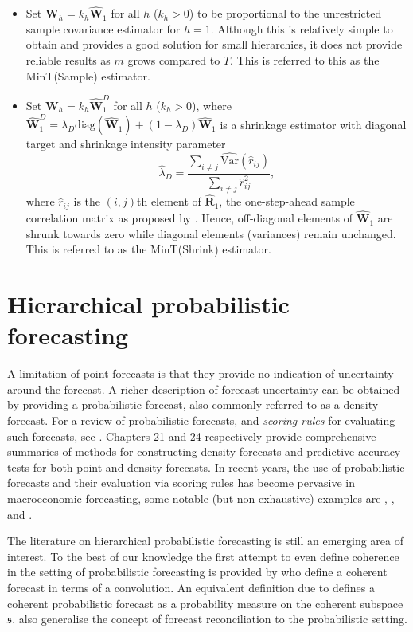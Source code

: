 {\begin{itemize}
	\item Set $\bm{W}_{h}=k_{h}\hat{\bm{W}}_{1}$ for all $h$ ($k_{h} > 0$) to be proportional to the unrestricted sample covariance estimator for $h=1$. Although this is relatively simple to obtain and provides a good solution for small hierarchies, it does not provide reliable results as $m$ grows compared to $T$. This is referred to this as the MinT(Sample) estimator.

	\item Set $\bm{W}_{h}=k_{h}\hat{\bm{W}}_{1}^D$ for all $h$ ($k_{h} > 0$), where $\hat{\bm{W}}^{D}_{1} = \lambda_{D} \text{diag}(\hat{\bm{W}}_{1}) + (1 - \lambda_{D})\hat{\bm{W}}_{1}$ is a shrinkage estimator with diagonal target and shrinkage intensity parameter
  $$
    \hat{\lambda}_{D} = \frac{\sum_{i \ne j}\hat{\text{Var}}(\hat{r}_{ij})}{\sum_{i \ne j}\hat{r}_{ij}^2},
  $$
	where $\hat{r}_{ij}$ is the $(i,j)$th element of $\hat{\bm{R}}_{1}$, the one-step-ahead sample correlation matrix as proposed by \citet{Schafer2005}. Hence, off-diagonal elements of $\hat{\bm{W}}_1$ are shrunk towards zero while diagonal elements (variances) remain unchanged. This is referred to as the MinT(Shrink) estimator.
\end{itemize}

\section{Hierarchical probabilistic forecasting}\label{sec:probforecasting}

A limitation of point forecasts is that they provide no indication of uncertainty around the forecast. A richer description of forecast uncertainty can be obtained by providing a probabilistic forecast, also commonly referred to as a density forecast. For a review of probabilistic forecasts, and \emph{scoring rules} for evaluating such forecasts, see \citep{Gneiting2014}. Chapters 21 and 24 respectively provide comprehensive summaries of methods for constructing density forecasts and predictive accuracy tests for both point and density forecasts. In recent years, the use of probabilistic forecasts and their evaluation via scoring rules has become pervasive in macroeconomic forecasting, some notable (but non-exhaustive) examples are \citet{GewAmi2010}, \citet{BilEtAl2013}, \citet{CarEtAl2015} and \citet{ClaRav2015}.

The literature on hierarchical probabilistic forecasting is still an emerging area of interest.  To the best of our knowledge the first attempt to even define coherence in the setting of probabilistic forecasting is provided by \citet{Taieb2017} who define a coherent forecast in terms of a convolution. An equivalent definition due to \citet{GamEtAl2018} defines a coherent probabilistic forecast as a probability measure on the coherent subspace $\mathfrak{s}$. \citet{GamEtAl2018} also generalise the concept of forecast reconciliation to the probabilistic setting.

}
